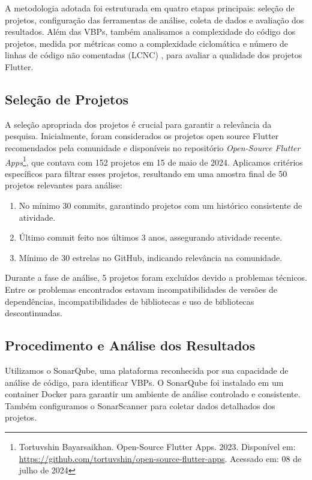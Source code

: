 \documentclass[12pt]{article}
\begin{document}
A metodologia adotada foi estruturada em quatro etapas principais: seleção de projetos, configuração das ferramentas de análise, coleta de dados e avaliação dos resultados. Além das VBPs, também analisamos a complexidade do código dos projetos, medida por métricas como a complexidade ciclomática e número de linhas de código não comentadas (LCNC) \cite{mccabe1976complexity}, para avaliar a qualidade dos projetos Flutter.

\subsection{Seleção de Projetos}
A seleção apropriada dos projetos é crucial para garantir a relevância da pesquisa. Inicialmente, foram considerados os projetos open source Flutter recomendados pela comunidade e disponíveis no repositório \textit{Open-Source Flutter Apps}\footnote{Tortuvshin Bayarsaikhan. Open-Source Flutter Apps. 2023. Disponível em: \url{https://github.com/tortuvshin/open-source-flutter-apps}. Acessado em: 08 de julho de 2024}, que contava com 152 projetos em 15 de maio de 2024. Aplicamos critérios específicos para filtrar esses projetos, resultando em uma amostra final de 50 projetos relevantes para análise:
\begin{enumerate}
    \item No mínimo 30 commits, garantindo projetos com um histórico consistente de atividade.
    \item Último commit feito nos últimos 3 anos, assegurando atividade recente.
    \item Mínimo de 30 estrelas no GitHub, indicando relevância na comunidade.
\end{enumerate}

Durante a fase de análise, 5 projetos foram excluídos devido a problemas técnicos. Entre os problemas encontrados estavam incompatibilidades de versões de dependências, incompatibilidades de bibliotecas e uso de bibliotecas descontinuadas.


\subsection{Procedimento e Análise dos Resultados}
Utilizamos o SonarQube, uma plataforma reconhecida por sua capacidade de análise de código, para identificar VBPs. O SonarQube foi instalado em um container Docker para garantir um ambiente de análise controlado e consistente. Também configuramos o SonarScanner para coletar dados detalhados dos projetos.
\end{document}
